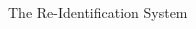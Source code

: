 \documentclass[final]{beamer}
\begin{document}
\begin{frame}{}
\begin{columns}[t]
\begin{column}{.48\linewidth}
 		\begin{block}{The Re-Identification System}

         

        \end{block}

      \end{column}
    \end{columns}

  \end{frame}
\end{document}
